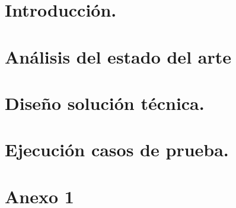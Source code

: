 \documentclass[12pt, a4paper]{book}
\begin{document}

\setmainfont{Carlito}
\frontmatter 


\tableofcontents	%
\listoffigures		%
\listoftables		%
\listofalgorithms   %
\listofcodes	    %
\cleardoublepage

\mainmatter
\pagestyle{fancy}

\chapter{Introducción.}


\chapter{Análisis del estado del arte}
 
 
\chapter{Diseño solución técnica.}


\chapter{Ejecución casos de prueba.}




\appendix
\chapter{Anexo 1}
\lipsum[1-2]

\cleardoublepage
\thispagestyle{empty}

% 

 

\printglossaries
\end{document}
